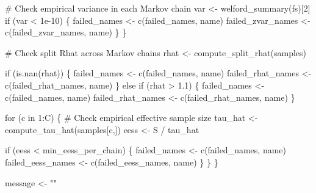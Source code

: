 \documentclass[
  letterpaper,
  DIV=11,
  numbers=noendperiod]{scrartcl}
\newenvironment{Shaded}{\begin{snugshade}}{\end{snugshade}}
\newcommand{\CommentTok}[1]{\textcolor[rgb]{0.37,0.37,0.37}{#1}}
\newcommand{\ControlFlowTok}[1]{\textcolor[rgb]{0.00,0.23,0.31}{#1}}
\newcommand{\DecValTok}[1]{\textcolor[rgb]{0.68,0.00,0.00}{#1}}
\newcommand{\FloatTok}[1]{\textcolor[rgb]{0.68,0.00,0.00}{#1}}
\newcommand{\FunctionTok}[1]{\textcolor[rgb]{0.28,0.35,0.67}{#1}}
\newcommand{\NormalTok}[1]{\textcolor[rgb]{0.00,0.23,0.31}{#1}}
\newcommand{\OtherTok}[1]{\textcolor[rgb]{0.00,0.23,0.31}{#1}}
\newcommand{\SpecialCharTok}[1]{\textcolor[rgb]{0.37,0.37,0.37}{#1}}
\newcommand{\StringTok}[1]{\textcolor[rgb]{0.13,0.47,0.30}{#1}}
\begin{document}
\begin{Shaded}
\begin{Highlighting}[]
      \CommentTok{\# Check empirical variance in each Markov chain}
\NormalTok{      var }\OtherTok{\textless{}{-}} \FunctionTok{welford\_summary}\NormalTok{(fs)[}\DecValTok{2}\NormalTok{]}
      \ControlFlowTok{if}\NormalTok{ (var }\SpecialCharTok{\textless{}} \FloatTok{1e{-}10}\NormalTok{) \{}
\NormalTok{        failed\_names }\OtherTok{\textless{}{-}} \FunctionTok{c}\NormalTok{(failed\_names, name)}
\NormalTok{        failed\_zvar\_names }\OtherTok{\textless{}{-}} \FunctionTok{c}\NormalTok{(failed\_zvar\_names, name) }
\NormalTok{      \}}
\NormalTok{    \}}

    \CommentTok{\# Check split Rhat across Markov chains}
\NormalTok{    rhat }\OtherTok{\textless{}{-}} \FunctionTok{compute\_split\_rhat}\NormalTok{(samples)}

    \ControlFlowTok{if}\NormalTok{ (}\FunctionTok{is.nan}\NormalTok{(rhat)) \{}
\NormalTok{      failed\_names }\OtherTok{\textless{}{-}} \FunctionTok{c}\NormalTok{(failed\_names, name)}
\NormalTok{      failed\_rhat\_names }\OtherTok{\textless{}{-}} \FunctionTok{c}\NormalTok{(failed\_rhat\_names, name)}
\NormalTok{    \} }\ControlFlowTok{else} \ControlFlowTok{if}\NormalTok{ (rhat }\SpecialCharTok{\textgreater{}} \FloatTok{1.1}\NormalTok{) \{}
\NormalTok{      failed\_names }\OtherTok{\textless{}{-}} \FunctionTok{c}\NormalTok{(failed\_names, name)}
\NormalTok{      failed\_rhat\_names }\OtherTok{\textless{}{-}} \FunctionTok{c}\NormalTok{(failed\_rhat\_names, name)}
\NormalTok{    \}}

    \ControlFlowTok{for}\NormalTok{ (c }\ControlFlowTok{in} \DecValTok{1}\SpecialCharTok{:}\NormalTok{C) \{}
      \CommentTok{\# Check empirical effective sample size}
\NormalTok{      tau\_hat }\OtherTok{\textless{}{-}} \FunctionTok{compute\_tau\_hat}\NormalTok{(samples[c,])}
\NormalTok{      eess }\OtherTok{\textless{}{-}}\NormalTok{ S }\SpecialCharTok{/}\NormalTok{ tau\_hat}
      
      \ControlFlowTok{if}\NormalTok{ (eess }\SpecialCharTok{\textless{}}\NormalTok{ min\_eess\_per\_chain) \{}
\NormalTok{        failed\_names }\OtherTok{\textless{}{-}} \FunctionTok{c}\NormalTok{(failed\_names, name)}
\NormalTok{        failed\_eess\_names }\OtherTok{\textless{}{-}} \FunctionTok{c}\NormalTok{(failed\_eess\_names, name)}
\NormalTok{      \}}
\NormalTok{    \}}
\NormalTok{  \}}
  
\NormalTok{  message }\OtherTok{\textless{}{-}} \StringTok{""}
  

\end{Highlighting}
\end{Shaded}
\end{document}
